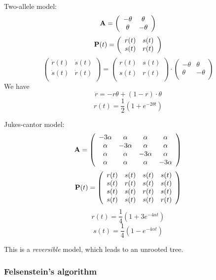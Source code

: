 \documentclass[10pt]{article}
\begin{document}
Two-allele model:
\[
{\bf A}=\left(\begin{array}{cccc}
-\theta & \theta \\
\theta & -\theta \\
\end{array}\right)
\]
\[
{\bf P}(t)=\left(\begin{array}{cc}
r(t) & s(t) \\
s(t) & r(t) \\
\end{array}\right)
\]
\[
\left(\begin{array}{cc}
\dot{r}(t) & \dot{s}(t) \\
\dot{s}(t) & \dot{r}(t) \\
\end{array}\right)
=
\left(\begin{array}{cc}
r(t) & s(t) \\
s(t) & r(t) \\
\end{array}\right)
\cdot
\left(\begin{array}{cc}
-\theta & \theta \\
\theta & -\theta \\
\end{array}\right)
\]
We have
$$
\dot{r}=-r\theta+(1-r)\cdot\theta
$$
\[
r(t)=\frac{1}{2}\left(1+e^{-2\theta t}\right)
\]

Jukes-cantor model:
\[
{\bf A}=\left(\begin{array}{cccc}
-3\alpha & \alpha & \alpha & \alpha \\
\alpha & -3\alpha & \alpha & \alpha \\
\alpha & \alpha & -3\alpha & \alpha \\
\alpha & \alpha & \alpha & -3\alpha \\
\end{array}\right)
\]
\[
{\bf P}(t)=\left(\begin{array}{cccc}
r(t) & s(t) & s(t) & s(t) \\
s(t) & r(t) & s(t) & s(t) \\
s(t) & s(t) & r(t) & s(t) \\
s(t) & s(t) & s(t) & r(t) \\
\end{array}\right)
\]
\[
r(t)=\frac{1}{4}(1+3e^{-4\alpha t})
\]
\[
s(t)=\frac{1}{4}(1-e^{-4\alpha t})
\]

This is a \emph{reversible} model, which leads to an unrooted tree.
\subsubsection{Felsenstein's algorithm}
\end{document}
